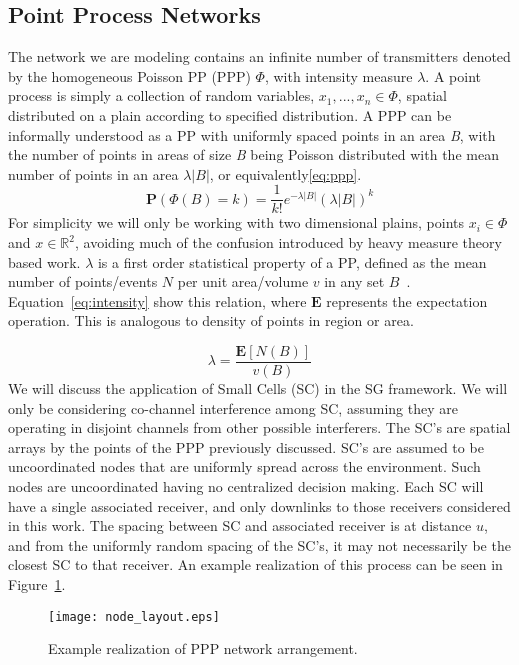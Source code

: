 \subsection{Point Process Networks}
%
The network we are modeling contains an infinite number of transmitters denoted by the homogeneous Poisson PP (PPP) $\Phi$, with intensity measure $\lambda$.  A point process is simply a collection of random variables, $x_1,...,x_n \in \Phi$, spatial distributed on a plain according to specified distribution.  A PPP can be informally understood as a PP with uniformly spaced points in an area \textit{B}, with the number of points in areas of size \textit{B} being Poisson distributed with the mean number of points in an area $\lambda|B|$, or equivalently\eqref{eq:ppp}.
\begin{equation}\label{eq:ppp}
  \textbf{P}(\Phi(B)=k) = \frac{1}{k!}e^{-\lambda|B|}(\lambda|B|)^k
\end{equation}
For simplicity we will only be working with two dimensional plains, points $x_i\in\Phi$ and $x\in\mathbb{R}^2$, avoiding much of the confusion introduced by heavy measure theory based work.  $\lambda$ is a first order statistical property of a PP, defined as the mean number of points/events  $\textit{N}$ per unit area/volume $\textit{v}$ in any set $\textit{B}$~\cite{Illian2008}.  Equation~\eqref{eq:intensity} show this relation, where $\textbf{E}$ represents the expectation operation.  This is analogous to density of points in region or area.
\par
%
\begin{equation}\label{eq:intensity}
\lambda = \frac{\textbf{E}[N(B)]}{v(B)}
\end{equation}
%
We will discuss the application of Small Cells (SC) in the SG framework.  We will only be considering co-channel interference among SC, assuming they are operating in disjoint channels from other possible interferers.  The SC's are spatial arrays by the points of the PPP previously discussed.  SC's are assumed to be uncoordinated nodes that are uniformly spread across the environment.  Such nodes are uncoordinated having no centralized decision making.  Each SC will have a single associated receiver, and only downlinks to those receivers considered in this work.  The spacing between SC and associated receiver is at distance $u$, and from the uniformly random spacing of the SC's, it may not necessarily be the closest SC to that receiver.  An example realization of this process can be seen in Figure~\ref{fig:realization}.
\par
%
\begin{figure}\label{fig:realization}
	\centering
	\texttt{[image: node\_layout.eps]}
	\caption{Example realization of PPP network arrangement.}
\end{figure}
%
